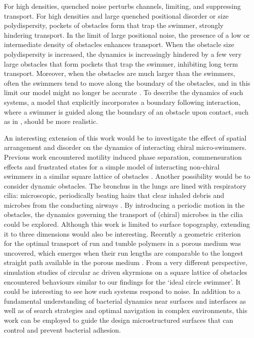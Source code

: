 \documentclass[aps,pre,twocolumn,showpacs,superscriptaddress,amsmath,amssymb,longbibliography]{revtex4-2}
\begin{document}
For high densities, quenched noise perturbs channels, limiting, and suppressing transport. For high densities and large quenched positional disorder or size polydispersity, pockets of obstacles form that trap the swimmer, strongly hindering transport. In the limit of large positional noise, the presence of a low or intermediate density of obstacles enhances transport. When the obstacle size polydispersity is increased, the dynamics is increasingly hindered by a few very large obstacles that form pockets that trap the swimmer, inhibiting long term transport. Moreover, when the obstacles are much larger than the swimmers, often the swimmers tend to move along the boundary of the obstacles, and in this limit our model might no longer be accurate \cite{following1,following2}. To describe the dynamics of such systems, a model that explicitly incorporates a boundary following interaction, where a swimmer is guided along the boundary of an obstacle upon contact, such as in \cite{franosh1, franosh2}, should be more realistic.

An interesting extension of this work would be to investigate the effect of spatial arrangement and disorder on the dynamics of interacting chiral micro-swimmers. Previous work encountered motility induced phase separation, commensuration effects and frustrated states for a simple model of interacting non-chiral swimmers in a similar square lattice of obstacles \cite{frustration}. Another possibility would be to consider dynamic obstacles. The bronchus in the lungs are lined with respiratory cilia: microscopic, periodically beating hairs that clear inhaled debris and microbes from the conducting airways \cite{cilia}. By introducing a periodic motion in the obstacles, the dynamics governing the transport of (chiral) microbes in the cilia could be explored.  Although this work is limited to surface topography, extending it to three dimensions would also be interesting. Recently a geometric criterion for the optimal transport of run and tumble polymers in a porous medium was uncovered, which emerges when their run lengths are comparable to the longest straight path available in the porous medium \cite{3d}. From a very different perspective, simulation studies of circular ac driven skyrmions on a square lattice of obstacles encountered behaviours similar to our findings for the `ideal circle swimmer'\cite{skyrmion}. It could be interesting to see how such systems respond to noise. In addition to a fundamental understanding of bacterial dynamics near surfaces and interfaces as well as of search strategies and optimal navigation in complex environments, this work can be employed to guide the design microstructured surfaces that can control and prevent bacterial adhesion. 
\end{document}
